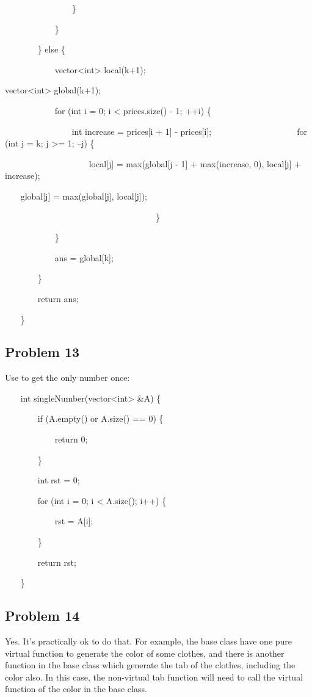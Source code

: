 \documentclass[10pt]{article}
\begin{document}
~~~~~~~~~~~~~~~ \}

~~~~~~~~~~~ \}

~~~~~~~ \} else \{

~~~~~~~~~~~ vector<int> local(k+1);

\qquad vector<int> global(k+1);

~~~~~~~~~~~ for (int i = 0; i < prices.size() - 1; ++i) \{

~~~~~~~~~~~~~~~ int increase = prices[i + 1] - prices[i];
~~~
~~~~~~~~~~~~~~~ for (int j = k; j >= 1; --j) \{

~~~~~~~~~~~~~~~~~~~ local[j] = max(global[j - 1] + max(increase, 0), local[j] + increase);

\qquad \qquad ~~~ global[j] = max(global[j], local[j]);

~~~~~~~~~~~~~~~~~~~
~~~~~~~~~~~~~~~ \}

~~~~~~~~~~~ \}

~~~~~~~~~~~ ans = global[k];

~~~~~~~ \}

~~~~~~~ return ans;

~~~ \}~

\subsection*{Problem 13~}
Use  to get the only number once:

~~~ int singleNumber(vector<int> \&A) \{

~~~~~~~ if (A.empty() or A.size() == 0) \{

~~~~~~~~~~~ return 0;

~~~~~~~ \}

~~~~~~~ int rst = 0;

~~~~~~~ for (int i = 0; i < A.size(); i++) \{

~~~~~~~~~~~ rst = A[i];

~~~~~~~ \}

~~~~~~~ return rst;

~~~ \}

\subsection*{Problem 14~}
Yes. It's practically ok to do that. For example, the base class have one pure virtual function to generate the color of some clothes, and there is another function in the base class which generate the tab of the clothes, including the color also. In this case, the non-virtual tab function will need to call the virtual function of the color in the base class.
\end{document}
